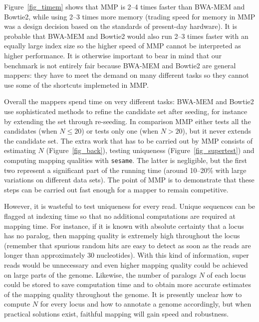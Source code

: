 \documentclass[a4,center,fleqn]{NAR}
\begin{document}
Figure~\ref{fig_timem} shows that MMP is 2--4 times faster than BWA-MEM
and Bowtie2, while using 2--3 times more memory (trading speed for memory
in MMP was a design decision based on the standards of present-day
hardware). It is probable that BWA-MEM and Bowtie2 would also run 2--3
times faster with an equally large index size so the higher speed of MMP
cannot be interpreted as higher performance. It is otherwise important to
bear in mind that our benchmark is not entirely fair because BWA-MEM and
Bowtie2 are general mappers: they have to meet the demand on many
different tasks so they cannot use some of the shortcuts implemeted in
MMP.

Overall the mappers spend time on very different tasks: BWA-MEM and
Bowtie2 use sophisticated methods to refine the candidate set after
seeding, for instance by extending the set through re-seeding. In
comparison MMP either tests all the candidates (when $N \leq 20$) or tests
only one (when $N > 20$), but it never extends the candidate set. The
extra work that has to be carried out by MMP consists of estimating $N$
(Figure~\ref{fig_back}), testing uniqueness (Figure~\ref{fig_supertest})
and computing mapping qualities with \texttt{sesame}. The latter is
negligible, but the first two represent a significant part of the running
time (around 10--20\% with large variations on different data sets). The
point of MMP is to demonstrate that these steps can be carried out fast
enough for a mapper to remain competitive.

However, it is wasteful to test uniqueness for every read. Unique
sequences can be flagged at indexing time so that no additional
computations are required at mapping time. For instance, if it is known
with absolute certainty that a locus has no paralog, then mapping quality
is extremely high throughout the locus (remember that spurious random hits
are easy to detect as soon as the reads are longer than approximately 30
nucleotides). With this kind of information, super reads would be
unnecessary and even higher mapping quality could be achieved on large
parts of the genome. Likewise, the number of paralogs $N$ of each locus
could be stored to save computation time and to obtain more accurate
estimates of the mapping quality throughout the genome. It is presently
unclear how to compute $N$ for every locus and how to annotate a genome
accordingly, but when practical solutions exist, faithful mapping will
gain speed and robustness.
\end{document}
